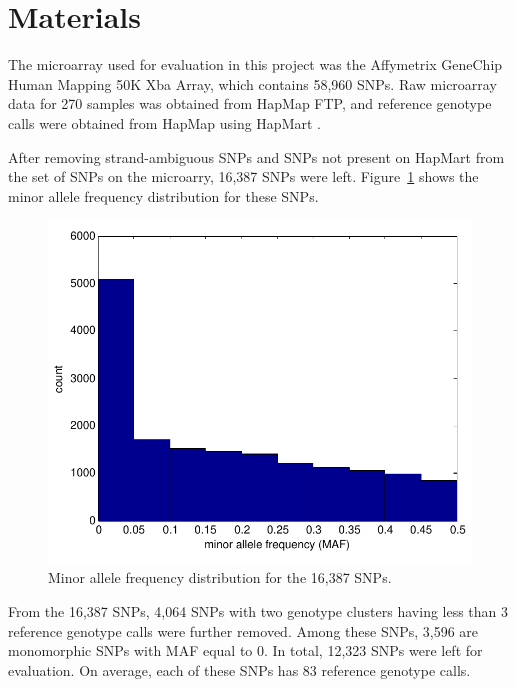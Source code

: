 \documentclass{scrartcl}
\begin{document}
\section{Materials}

\par
The microarray used for evaluation in this project was the Affymetrix GeneChip
Human Mapping 50K Xba Array, which contains 58,960 SNPs.
Raw microarray data for 270 samples was obtained from HapMap FTP, and
reference genotype calls were obtained from HapMap using
HapMart \cite{hapmap2003}.

\par
After removing strand-ambiguous SNPs and SNPs not present on HapMart from the
set of SNPs on the microarry, 16,387 SNPs were left.
Figure~\ref{fig:data_maf_dist} shows the minor allele frequency distribution
for these SNPs.

\begin{figure}[H]
\centering
\includegraphics[scale=0.75]
{data_figs/maf_dist.pdf}
\caption{Minor allele frequency distribution for the 16,387 SNPs.}
\label{fig:data_maf_dist}
\end{figure}

\par
From the 16,387 SNPs, 4,064 SNPs with two genotype clusters having less than
3 reference genotype calls were further removed.
Among these SNPs, 3,596 are monomorphic SNPs with MAF equal to 0.
In total, 12,323 SNPs were left for evaluation.
On average, each of these SNPs has 83 reference genotype calls.
\end{document}
